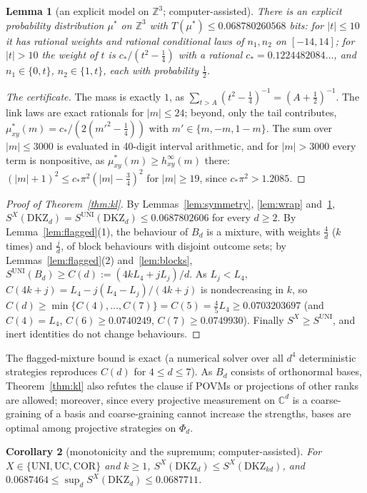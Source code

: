 \documentclass[11pt]{article}
\newtheorem{lemma}{Lemma}[section]
\newtheorem{corollary}[lemma]{Corollary}
\theoremstyle{remark}
\numberwithin{equation}{section}
\newcommand{\Z}{\mathbb{Z}}
\newcommand{\C}{\mathbb{C}}
\newcommand{\DKZ}{\mathrm{DKZ}}
\newcommand{\UNI}{\mathrm{UNI}}
\newcommand{\UC}{\mathrm{UC}}
\newcommand{\COR}{\mathrm{COR}}
\begin{document}
\begin{lemma}[an explicit model on $\Z^3$; computer-assisted]\label{lem:zmodel}
There is an explicit probability distribution $\mu^*$ on $\Z^3$ with $T(\mu^*)\le0.068780260568$ bits: for $|t|\le10$
it has rational weights and rational conditional laws of $n_1,n_2$ on $[-14,14]$; for $|t|>10$ the weight of $t$ is
$c_*/(t^2-\frac14)$ with a rational $c_*=0.1224482084\ldots$, and $n_1\in\{0,t\}$, $n_2\in\{1,t\}$, each with
probability $\frac12$.
\end{lemma}

\begin{proof}[The certificate]
The mass is exactly $1$, as $\sum_{t>A}(t^2-\frac14)^{-1}=(A+\frac12)^{-1}$. The link laws are exact rationals for
$|m|\le24$; beyond, only the tail contributes, $\mu^*_{xy}(m)=c_*/(2(m'^2-\frac14))$ with $m'\in\{m,-m,1-m\}$. The sum
over $|m|\le3000$ is evaluated in 40-digit interval arithmetic, and for $|m|>3000$ every term is nonpositive, as
$\mu^*_{xy}(m)\ge h^\infty_{xy}(m)$ there: $(|m|+1)^2\le c_*\pi^2(|m|-\frac34)^2$ for $|m|\ge19$, since $c_*\pi^2>1.2085$.
\end{proof}

\begin{proof}[Proof of Theorem~\ref{thm:kl}]
By Lemmas~\ref{lem:symmetry}, \ref{lem:wrap} and~\ref{lem:zmodel}, $S^X(\DKZ_d)=S^{\UNI}(\DKZ_d)\le0.0687802606$ for every
$d\ge2$. By Lemma~\ref{lem:flagged}(1), the behaviour of $B_d$ is a mixture, with weights $\frac4d$ ($k$ times) and
$\frac jd$, of block behaviours with disjoint outcome sets; by Lemmas~\ref{lem:flagged}(2) and~\ref{lem:blocks},
$S^{\UNI}(B_d)\ge C(d):=(4kL_4+jL_j)/d$. As $L_j<L_4$, $C(4k+j)=L_4-j(L_4-L_j)/(4k+j)$ is nondecreasing in $k$, so
$C(d)\ge\min\{C(4),\dots,C(7)\}=C(5)=\frac45L_4\ge0.0703203697$ (and $C(4)=L_4$, $C(6)\ge0.0740249$, $C(7)\ge0.0749930$).
Finally $S^X\ge S^{\UNI}$, and inert identities do not change behaviours.
\end{proof}

The flagged-mixture bound is exact (a numerical solver over all $d^4$ deterministic strategies reproduces $C(d)$ for
$4\le d\le7$). As $B_d$ consists of orthonormal bases, Theorem~\ref{thm:kl} also refutes the clause if POVMs or
projections of other ranks are allowed; moreover, since every projective measurement on $\C^d$ is a coarse-graining of
a basis and coarse-graining cannot increase the strengths, bases are optimal among projective strategies on $\Phi_d$.

\begin{corollary}[monotonicity and the supremum; computer-assisted]\label{cor:klsup}
For $X\in\{\UNI,\UC,\COR\}$ and $k\ge1$, $S^X(\DKZ_d)\le S^X(\DKZ_{kd})$, and
$0.0687464\le\sup_dS^X(\DKZ_d)\le0.0687711$.
\end{corollary}
\end{document}
